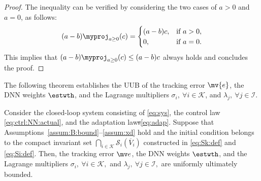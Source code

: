 \documentclass[letterpaper, journal]{IEEEtran}
\providecommand{\DIFadd}[1]{{\protect\color{blue}\uwave{#1}}} %
\providecommand{\DIFdel}[1]{{\protect\color{red}\sout{#1}}} %
\providecommand{\DIFaddbegin}{} %
\providecommand{\DIFaddend}{} %
\providecommand{\DIFdelbegin}{} %
\providecommand{\DIFdelend}{} %
\begin{document}
\begin{proof}
  The inequality can be verified by considering the two cases of $a>0$ and $a=0$, as follows:
  \DIFdelbegin %
\DIFdelend \DIFaddbegin \begin{equation*}
    (a-b)\myproj_{a\ge0}(c) 
    =
    \begin{cases}
      (a-b) c, & \text{if } a>0,
      \\
      0, & \text{if } a=0.
    \end{cases}
  \end{equation*}\DIFaddend 
  This implies that $(a-b)\myproj_{a\ge0}(c) \le (a-b) c$ always holds and concludes the proof.
\end{proof}

The following theorem establishes the UUB of the tracking error $\mv{e}$, the DNN weights $\estwth$, and the Lagrange multipliers $\sigma_i,\ \forall i \in \mathcal{K}$, and $\lambda_j,\ \forall j \in \mathcal{I}$.

\begin{theorem} \label{thm:stability}
  Consider the closed-loop system consisting of \eqref{eq:sys}, the control law \eqref{eq:ctrl:NN:actual}, and the adaptation law\DIFdelbegin \DIFdel{s}\DIFdelend  \eqref{eq:adap}.
  Suppose that Assumptions~\ref{assum:B:bound}--\ref{assum:xd} hold and the initial condition belongs to the compact invariant set 
  \DIFdelbegin \DIFdel{$
  \bigcap_{i\in\mathcal K}
  \mathcal S_i(\overline V_i)
  $ 
  }\DIFdelend \DIFaddbegin \DIFadd{$
  \prod_{\ell=0}^k \mathcal{S}_\ell(\overline V_\ell)
  $ 
  }\DIFaddend constructed in \eqref{eq:Sk:def} and \eqref{eq:Si:def}.
  Then, the tracking error $\mv e$, the DNN weights $\estwth$, and the Lagrange multipliers $\sigma_i,\ \forall i \in \mathcal{K},$ and $\lambda_j,\ \forall j \in \mathcal{I},$ are uniformly ultimately bounded.
\end{theorem}
\end{document}
